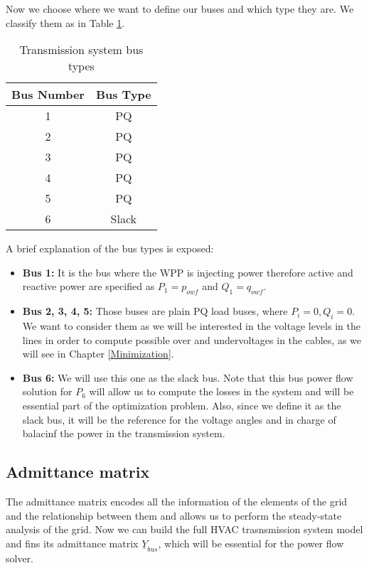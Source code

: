 \documentclass[a4paper,11pt, titlepage, twoside]{article}
\begin{document}
Now we choose where we want to define our buses and which type they are. We classify them as in Table \ref{table:bus_types}.
\begin{table}[h]
\centering
\begin{tabular}{c|c}
\hline
\textbf{Bus Number} & \textbf{Bus Type} \\
\hline
1 & PQ \\
2 & PQ \\
3 & PQ \\
4 & PQ \\
5 & PQ \\
6 & Slack \\
\hline
\end{tabular}
\caption{ Transmission system bus types}
\label{table:bus_types}
\end{table}

A brief explanation of the bus types is exposed:
\begin{itemize}
    \item \textbf{Bus 1:} It is the bus where the WPP is injecting power therefore active and reactive power are specified as $P_1=p_{owf}$ and $Q_1=q_{owf}$.
    \item \textbf{Bus 2, 3, 4, 5:} Those buses are plain  PQ load buses, where $P_i=0, Q_i=0$. We want to consider them as we will be interested in the voltage levels in the lines in order
    to compute possible over and undervoltages in the cables, as we will see in Chapter \ref{Minimization}.
    \item \textbf{Bus 6:} We will use this one as the slack bus. Note that this bus power flow solution for $P_6$ will allow us to compute the losses in the system
    and will be essential part of the optimization problem. Also, since we define it as the slack bus, it will be the reference for the voltage angles and in charge of balacinf the power in the transmission system. 
\end{itemize}
\subsection{Admittance matrix}

The admittance matrix encodes all the information of the elements of the grid and the relationship between them and allows us to perform the steady-state 
analysis of the grid.
Now we can build the full HVAC trasnsmission system model and fins its admittance matrix $\underline{Y}_{bus}$, which will be essential
for the power flow solver.
\end{document}
